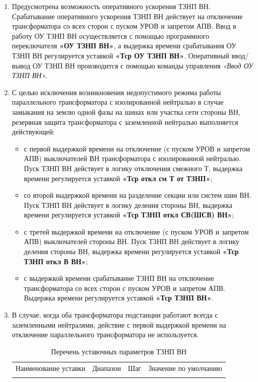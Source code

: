 \begin{enumerate}[label=\arabic{section}.\arabic{subsection}.\arabic*,  align=left, labelsep=4pt, leftmargin=0pt, itemindent=57pt]
\item
Предусмотрена возможность оперативного ускорения ТЗНП ВН. Срабатывание оперативного ускорения
ТЗНП ВН действует на отключение трансформатора со всех сторон с пуском УРОВ и запретом АПВ. Ввод в
работу ОУ ТЗНП ВН осуществляется с помощью программного переключателя \textbf{«ОУ ТЗНП ВН»}, а выдержка
времени срабатывания ОУ ТЗНП ВН регулируется уставкой \textbf{«Тср ОУ ТЗНП ВН»}. Оперативный ввод/вывод ОУ
ТЗНП ВН производится с помощью команды управления \textit{«Ввод ОУ ТЗНП ВН»}.

\item
С целью исключения возникновения недопустимого режима работы параллельного трансформатора с
изолированной нейтралью в случае замыкания на землю одной фазы на шинах или участка сети стороны ВН,
резервная защита трансформатора с заземленной нейтралью выполняется действующей:
\begin{itemize}
\item с первой выдержкой времени на отключение (с пуском УРОВ и запретом АПВ) выключателей ВН трансформатора с изолированной нейтралью. Пуск ТЗНП ВН действует в логику отключения смежного Т, выдержка времени регулируется уставкой \textbf{«Тср откл см Т от ТЗНП»};
\item со второй выдержкой времени на разделение секции или систем шин ВН. Пуск ТЗНП ВН действует в логику деления стороны ВН, выдержка времени регулируется уставкой \textbf{«Тср ТЗНП откл СВ(ШСВ) ВН»};
\item с третей выдержкой времени на отключение (с пуском УРОВ и запретом АПВ) выключателей стороны ВН. Пуск ТЗНП ВН действует в логику деления стороны ВН, выдержка времени регулируется уставкой \textbf{«Тср ТЗНП откл В ВН»};
\item с выдержкой времени срабатывание ТЗНП ВН на отключение трансформатора со всех сторон с пуском УРОВ и запретом АПВ. Выдержка времени регулируется уставкой \textbf{«Тср ТЗНП ВН»}.
\end{itemize}

\item
В случае, когда оба трансформатора подстанции работают всегда с заземленными нейтралями, действие с
первой выдержкой времени на отключение параллельного трансформатора не используется.


\small
\setlength{\extrarowheight}{0.05cm} %
\begin{longtable}
{|>{\centering\arraybackslash}m{4.5cm}|>{\centering\arraybackslash}m{4.5cm}|>{\centering\arraybackslash}m{3cm}|>{\centering\arraybackslash}m{3.5cm}|}
\caption{Перечень уставочных параметров ТЗНП ВН\hfill\vspace{-0.5\baselineskip}}\label{tznp_vn:tbl1} \\ 
\hhline{|-|-|-|-|}
\rowcolor{gray!30}
Наименование уставки & Диапазон & Шаг &  Значение по умолчанию \\ 
\hhline{|-|-|-|-|}
\endfirsthead


\end{longtable}
\end{enumerate}
